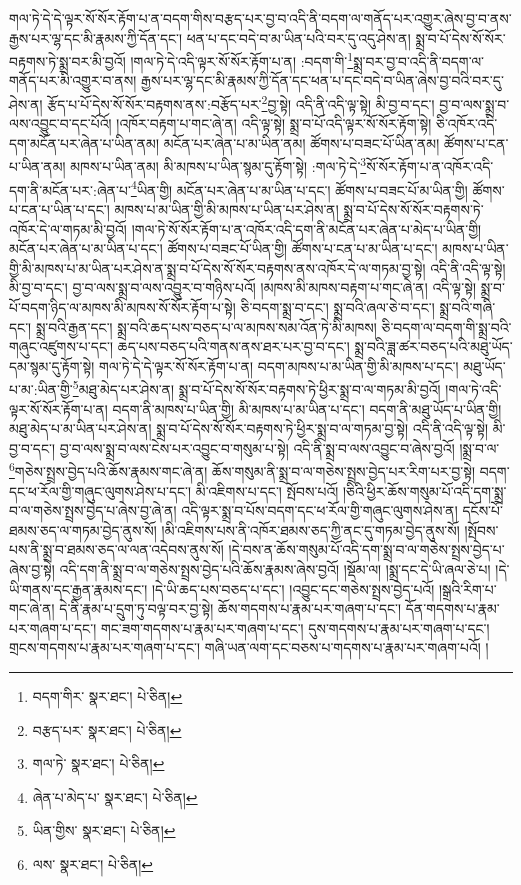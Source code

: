 གལ་ཏེ་དེ་དེ་ལྟར་སོ་སོར་རྟོག་པ་ན་བདག་གིས་བརྩད་པར་བྱ་བ་འདི་ནི་བདག་ལ་གནོད་པར་འགྱུར་ཞེས་བྱ་བ་ནས་རྒྱས་པར་ལྷ་དང་མི་རྣམས་ཀྱི་དོན་དང་། ཕན་པ་དང་བདེ་བ་མ་ཡིན་པའི་བར་དུ་འདུ་ཤེས་ན། སྨྲ་བ་པོ་དེས་སོ་སོར་བརྟགས་ཏེ་སྨྲ་བར་མི་བྱའོ། །གལ་ཏེ་དེ་འདི་ལྟར་སོ་སོར་རྟོག་པ་ན། :བདག་གི་\footnote{བདག་གིར་  སྣར་ཐང་།  པེ་ཅིན། }སྨྲ་བར་བྱ་བ་འདི་ནི་བདག་ལ་གནོད་པར་མི་འགྱུར་བ་ནས། རྒྱས་པར་ལྷ་དང་མི་རྣམས་ཀྱི་དོན་དང་ཕན་པ་དང་བདེ་བ་ཡིན་ཞེས་བྱ་བའི་བར་དུ་ཤེས་ན། རྩོད་པ་པོ་དེས་སོ་སོར་བརྟགས་ནས་:བརྩོད་པར་\footnote{བརྩད་པར་  སྣར་ཐང་།  པེ་ཅིན། }བྱ་སྟེ། འདི་ནི་འདི་ལྟ་སྟེ། མི་བྱ་བ་དང་། བྱ་བ་ལས་སྨྲ་བ་ལས་འབྱུང་བ་དང་པོའོ། །འཁོར་བརྟག་པ་གང་ཞེ་ན། འདི་ལྟ་སྟེ། སྨྲ་བ་པོ་འདི་ལྟར་སོ་སོར་རྟོག་སྟེ། ཅི་འཁོར་འདི་དག་མངོན་པར་ཞེན་པ་ཡིན་ནམ། མངོན་པར་ཞེན་པ་མ་ཡིན་ནམ། ཚོགས་པ་བཟང་པོ་ཡིན་ནམ། ཚོགས་པ་ངན་པ་ཡིན་ནམ། མཁས་པ་ཡིན་ནམ། མི་མཁས་པ་ཡིན་སྙམ་དུ་རྟོག་སྟེ། :གལ་ཏེ་དེ་\footnote{གལ་ཏེ་  སྣར་ཐང་།  པེ་ཅིན། }སོ་སོར་རྟོག་པ་ན་འཁོར་འདི་དག་ནི་མངོན་པར་:ཞེན་པ་\footnote{ཞེན་པ་མེད་པ་  སྣར་ཐང་།  པེ་ཅིན། }ཡིན་གྱི། མངོན་པར་ཞེན་པ་མ་ཡིན་པ་དང་། ཚོགས་པ་བཟང་པོ་མ་ཡིན་གྱི། ཚོགས་པ་ངན་པ་ཡིན་པ་དང་། མཁས་པ་མ་ཡིན་གྱི་མི་མཁས་པ་ཡིན་པར་ཤེས་ན། སྨྲ་བ་པོ་དེས་སོ་སོར་བརྟགས་ཏེ་འཁོར་དེ་ལ་གཏམ་མི་བྱའོ། །གལ་ཏེ་སོ་སོར་རྟོག་པ་ན་འཁོར་འདི་དག་ནི་མངོན་པར་ཞེན་པ་མེད་པ་ཡིན་གྱི། མངོན་པར་ཞེན་པ་མ་ཡིན་པ་དང་། ཚོགས་པ་བཟང་པོ་ཡིན་གྱི། ཚོགས་པ་ངན་པ་མ་ཡིན་པ་དང་། མཁས་པ་ཡིན་གྱི་མི་མཁས་པ་མ་ཡིན་པར་ཤེས་ན་སྨྲ་བ་པོ་དེས་སོ་སོར་བརྟགས་ནས་འཁོར་དེ་ལ་གཏམ་བྱ་སྟེ། འདི་ནི་འདི་ལྟ་སྟེ། མི་བྱ་བ་དང་། བྱ་བ་ལས་སྨྲ་བ་ལས་འབྱུར་བ་གཉིས་པའོ། །མཁས་མི་མཁས་བརྟག་པ་གང་ཞེ་ན། འདི་ལྟ་སྟེ། སྨྲ་བ་པོ་བདག་ཉིད་ལ་མཁས་མི་མཁས་སོ་སོར་རྟོག་པ་སྟེ། ཅི་བདག་སྨྲ་བ་དང་། སྨྲ་བའི་ཞལ་ཅེ་བ་དང་། སྨྲ་བའི་གཞི་དང་། སྨྲ་བའི་རྒྱན་དང་། སྨྲ་བའི་ཆད་པས་བཅད་པ་ལ་མཁས་སམ་འོན་ཏེ་མི་མཁས། ཅི་བདག་ལ་བདག་གི་སྨྲ་བའི་གཞུང་འཛུགས་པ་དང་། ཆད་པས་བཅད་པའི་གནས་ནས་ཐར་པར་བྱ་བ་དང་། སྨྲ་བའི་ཟླ་ཚར་བཅད་པའི་མཐུ་ཡོད་དམ་སྙམ་དུ་རྟོག་སྟེ། གལ་ཏེ་དེ་དེ་ལྟར་སོ་སོར་རྟོག་པ་ན། བདག་མཁས་པ་མ་ཡིན་གྱི་མི་མཁས་པ་དང་། མཐུ་ཡོད་པ་མ་:ཡིན་གྱི་\footnote{ཡིན་གྱིས་  སྣར་ཐང་།  པེ་ཅིན། }མཐུ་མེད་པར་ཤེས་ན། སྨྲ་བ་པོ་དེས་སོ་སོར་བརྟགས་ཏེ་ཕྱིར་སྨྲ་བ་ལ་གཏམ་མི་བྱའོ། །གལ་ཏེ་འདི་ལྟར་སོ་སོར་རྟོག་པ་ན། བདག་ནི་མཁས་པ་ཡིན་གྱི། མི་མཁས་པ་མ་ཡིན་པ་དང་། བདག་ནི་མཐུ་ཡོད་པ་ཡིན་གྱི། མཐུ་མེད་པ་མ་ཡིན་པར་ཤེས་ན། སྨྲ་བ་པོ་དེས་སོ་སོར་བརྟགས་ཏེ་ཕྱིར་སྨྲ་བ་ལ་གཏམ་བྱ་སྟེ། འདི་ནི་འདི་ལྟ་སྟེ། མི་བྱ་བ་དང་། བྱ་བ་ལས་སྨྲ་བ་ལས་ངེས་པར་འབྱུང་བ་གསུམ་པ་སྟེ། འདི་ནི་སྨྲ་བ་ལས་འབྱུང་བ་ཞེས་བྱའོ། །སྨྲ་བ་ལ་\footnote{ལས་  སྣར་ཐང་།  པེ་ཅིན། }གཅེས་སྤྲས་བྱེད་པའི་ཆོས་རྣམས་གང་ཞེ་ན། ཆོས་གསུམ་ནི་སྨྲ་བ་ལ་གཅེས་སྤྲས་བྱེད་པར་རིག་པར་བྱ་སྟེ། བདག་དང་ཕ་རོལ་གྱི་གཞུང་ལུགས་ཤེས་པ་དང་། མི་འཇིགས་པ་དང་། སྤོབས་པའོ། །ཅིའི་ཕྱིར་ཆོས་གསུམ་པོ་འདི་དག་སྨྲ་བ་ལ་གཅེས་སྤྲས་བྱེད་པ་ཞེས་བྱ་ཞེ་ན། འདི་ལྟར་སྨྲ་བ་པོས་བདག་དང་ཕ་རོལ་གྱི་གཞུང་ལུགས་ཤེས་ན། དངོས་པོ་ཐམས་ཅད་ལ་གཏམ་བྱེད་ནུས་སོ། །མི་འཇིགས་པས་ནི་འཁོར་ཐམས་ཅད་ཀྱི་ནང་དུ་གཏམ་བྱེད་ནུས་སོ། །སྤོབས་པས་ནི་སྨྲ་བ་ཐམས་ཅད་ལ་ལན་འདེབས་ནུས་སོ། །དེ་བས་ན་ཆོས་གསུམ་པོ་འདི་དག་སྨྲ་བ་ལ་གཅེས་སྤྲས་བྱེད་པ་ཞེས་བྱ་སྟེ། འདི་དག་ནི་སྨྲ་བ་ལ་གཅེས་སྤྲས་བྱེད་པའི་ཆོས་རྣམས་ཞེས་བྱའོ། །སྡོམ་ལ། །སྨྲ་དང་དེ་ཡི་ཞལ་ཅེ་པ། །དེ་ཡི་གནས་དང་རྒྱན་རྣམས་དང་། །དེ་ཡི་ཆད་པས་བཅད་པ་དང་། །འབྱུང་དང་གཅེས་སྤྲས་བྱེད་པའོ། །སྒྲའི་རིག་པ་གང་ཞེ་ན། དེ་ནི་རྣམ་པ་དྲུག་ཏུ་བལྟ་བར་བྱ་སྟེ། ཆོས་གདགས་པ་རྣམ་པར་གཞག་པ་དང་། དོན་གདགས་པ་རྣམ་པར་གཞག་པ་དང་། གང་ཟག་གདགས་པ་རྣམ་པར་གཞག་པ་དང་། དུས་གདགས་པ་རྣམ་པར་གཞག་པ་དང་། གྲངས་གདགས་པ་རྣམ་པར་གཞག་པ་དང་། གཞི་ཡན་ལག་དང་བཅས་པ་གདགས་པ་རྣམ་པར་གཞག་པའོ། །

